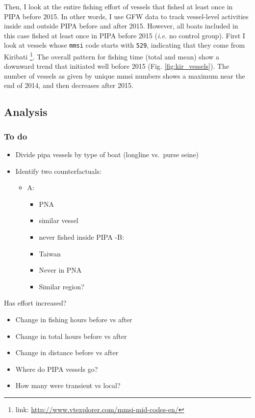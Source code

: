 \documentclass[]{article}
\providecommand{\tightlist}{%
  \setlength{\itemsep}{0pt}\setlength{\parskip}{0pt}}
\let\rmarkdownfootnote\footnote%
\def\footnote{\protect\rmarkdownfootnote}
\theoremstyle{definition}
\theoremstyle{definition}
\theoremstyle{definition}
\theoremstyle{remark}
\begin{document}
Then, I look at the entire fishing effort of vessels that fished at
least once in PIPA before 2015. In other words, I use GFW data to track
vessel-level activities inside and outside PIPA before and after 2015.
However, all boats included in this case fished at least once in PIPA
before 2015 (\emph{i.e.} no control group). First I look at vessels
whose \texttt{mmsi} code starts with \texttt{529}, indicating that they
come from Kiribati \footnote{link:
  \url{http://www.vtexplorer.com/mmsi-mid-codes-en/}}. The overall
pattern for fishing time (total and mean) show a downward trend that
initiated well before 2015 (Fig. \ref{fig:kir_vessels}). The number of
vessels as given by unique mmsi numbers shows a maximum near the end of
2014, and then decreases after 2015.

\subsection{Analysis}\label{analysis}

\subsubsection{To do}\label{to-do}

\begin{itemize}
\tightlist
\item
  Divide pipa vessels by type of boat (longline vs.~purse seine)
\item
  Identify two counterfactuals:

  \begin{itemize}
  \tightlist
  \item
    A:

    \begin{itemize}
    \tightlist
    \item
      PNA
    \item
      similar vessel
    \item
      never fished inside PIPA -B:
    \item
      Taiwan
    \item
      Never in PNA
    \item
      Similar region?
    \end{itemize}
  \end{itemize}
\end{itemize}

Has effort increased?

\begin{itemize}
\tightlist
\item
  Change in fishing hours before vs after
\item
  Change in total hours before vs after
\item
  Change in distance before vs after
\item
  Where do PIPA vessels go?
\item
  How many were transient vs local?
\end{itemize}
\end{document}
